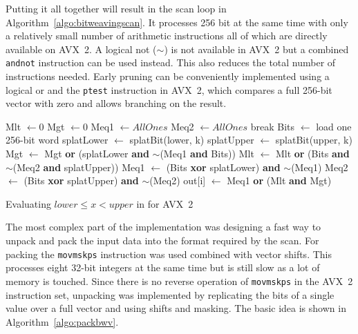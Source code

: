 Putting it all together will result in the scan loop in
Algorithm~\ref{algo:bitweavingscan}. It processes 256 bit at the same time with
only a relatively small number of arithmetic instructions all of which are
directly available on AVX~2. A logical not ($\sim$) is not available in AVX~2
but a combined \texttt{andnot} instruction can be used instead. This also
reduces the total number of instructions needed. Early pruning can be
conveniently implemented using a logical or and the \texttt{ptest} instruction
in AVX~2, which compares a full 256-bit vector with zero and allows branching on
the result.

\begin{algorithm}[h]
\begin{algorithmic}[1]
    \State Mlt $\gets 0$
    \State Mgt $\gets 0$
    \State Meq1 $\gets AllOnes$
    \State Meq2 $\gets AllOnes$
          \State break 
        \EndIf
        \State Bits $\gets$ load one 256-bit word
        \State splatLower $\gets$ splatBit(lower, k)
        \State splatUpper $\gets$ splatBit(upper, k)
        \State Mgt $\gets$ Mgt \textbf{or} (splatLower \textbf{and} $\sim$(Meq1 \textbf{and} Bits))
        \State Mlt $\gets$ Mlt \textbf{or} (Bits \textbf{and} $\sim$(Meq2 \textbf{and} splatUpper))
        \State Meq1 $\gets$ (Bits \textbf{xor} splatLower) \textbf{and} $\sim$(Meq1)
        \State Meq2 $\gets$ (Bits \textbf{xor} splatUpper) \textbf{and} $\sim$(Meq2)
      \EndFor
    \EndFor
    \State out[i] $\gets$ Meq1 \textbf{or} (Mlt \textbf{and} Mgt)
  \EndFor
  \EndProcedure
\end{algorithmic}
\caption{Evaluating $lower \le x < upper$ in \bwv{} for AVX~2}
\label{algo:bitweavingscan}
\end{algorithm}

The most complex part of the implementation was designing a fast way to unpack
and pack the input data into the format required by the \bwv{} scan. For packing
the \texttt{movmskps} instruction was used combined with vector shifts. This
processes eight 32-bit integers at the same time but is still slow as a lot of
memory is touched. Since there is no reverse operation of \texttt{movmskps} in
the AVX~2 instruction set, unpacking was implemented by replicating the bits of a
single value over a full vector and using shifts and masking. The basic idea is
shown in Algorithm~\ref{algo:packbwv}.


